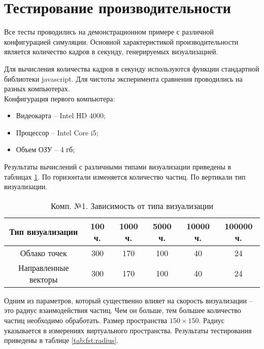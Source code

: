 \newpage
\section{Тестирование производительности}

Все тесты проводились на демонстрационном примере с различной конфигурацией
симуляции. Основной характеристикой производительности является количество 
кадров в секунду, генерируемых визуализацией.

Для вычисления количества кадров в секунду используются функции стандартной 
библиотеки javascript. Для чистоты эксперимента сравнения проводились
на разных компьютерах. \\

Конфигурация первого компьютера:

\begin{itemize}
  \item Видеокарта -- Intel HD 4000;
  \item Процессор -- Intel Core i5;
  \item Объем ОЗУ -- 4 гб;
\end{itemize}

Результаты вычислений с различными типами визуализации приведены 
в таблицах \ref{tab:fst:simple}. По горизонтали изменяется количество частиц.
По вертикали тип визуализации.

\begin{table}[H]
  \caption{\label{tab:fst:simple}Комп. №1. Зависимость от типа визуализации}
  \begin{center}
    \begin{tabular}{|c|c|c|c|c|c|}
      \hline
      Тип визуализации & 100 ч. & 1000 ч. & 5000 ч. & 10000 ч. & 100000 ч. \\
      \hline
      Облако точек & 300 & 170 & 100 & 40 & 24 \\
      Направленные векторы & 300 & 170 & 100 & 40 & 24 \\
      \hline
    \end{tabular}
  \end{center}
\end{table}

Одним из параметров, который существенно влияет на скорость визуализации -- это
радиус взаимодействия частиц. Чем он больше, тем большее количество частиц необходимо
обработать. Размер пространства $150\times150$. Радиус указывается в измерениях
виртуального пространства. Результаты тестирования приведены в таблице \ref{tab:fst:radius}.

